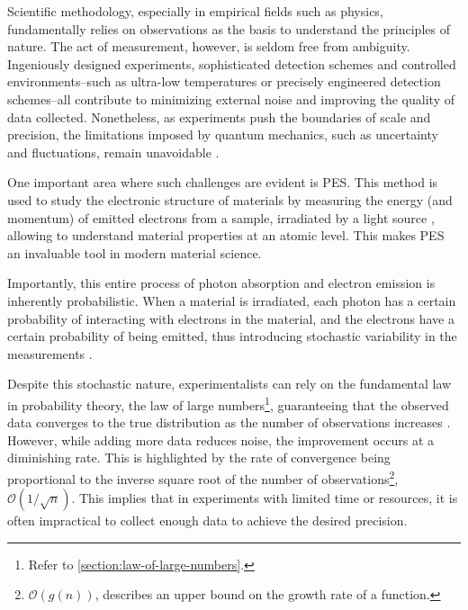 Scientific methodology, especially in empirical fields such as physics, fundamentally relies on observations as the basis to understand the principles of nature. The act of measurement, however, is seldom free from ambiguity. Ingeniously designed experiments, sophisticated detection schemes and controlled environments--such as ultra-low temperatures or precisely engineered detection schemes--all contribute to minimizing external noise and improving the quality of data collected. Nonetheless, as experiments push the boundaries of scale and precision, the limitations imposed by quantum mechanics, such as uncertainty and fluctuations, remain unavoidable \cite{heisenbergPhysicalPrinciplesQuantum2009,sakuraiModernQuantumMechanics2020,binneyPhysicsQuantumMechanics2014}.

One important area where such challenges are evident is \gls{PES}. This method is used to study the electronic structure of materials by measuring the energy (and momentum) of emitted electrons from a sample, irradiated by a light source \cite{cardonaGeneralPrinciples1978}, allowing to understand material properties at an atomic level. This makes \gls{PES} an invaluable tool in modern material science. 

Importantly, this entire process of photon absorption and electron emission is inherently probabilistic. When a material is irradiated, each photon has a certain probability of interacting with electrons in the material, and the electrons have a certain probability of being emitted, thus introducing stochastic variability in the measurements \cite{sakuraiModernQuantumMechanics2020}.

Despite this stochastic nature, experimentalists can rely on the fundamental law in probability theory, the law of large numbers\footnote{Refer to \cref{section:law-of-large-numbers}.}, guaranteeing that the observed data converges to the true distribution as the number of observations increases \cite{fellerIntroductionProbabilityTheory1991a}. However, while adding more data reduces \gls{noise}, the improvement occurs at a diminishing rate. This is highlighted by the rate of convergence being proportional to the inverse square root of the number of observations\footnote{$\mathcal{O}(g(n))$, describes an upper bound on the growth rate of a function.}, $\mathcal{O}(1/\sqrt{n})$. This implies that in experiments with limited time or resources, it is often impractical to collect enough data to achieve the desired precision.

